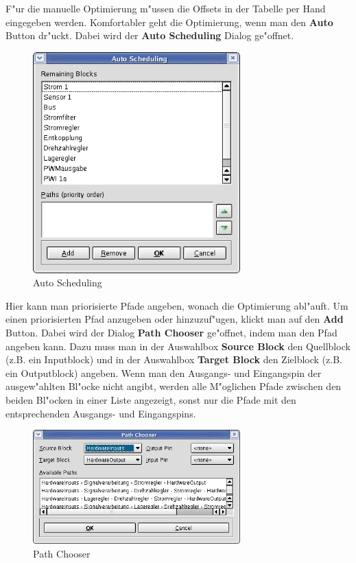 \documentclass[a4paper,titlepage,12pt,ngerman]{scrbook}
\begin{document}
F"ur die manuelle Optimierung m"ussen die Offsets in der Tabelle per Hand eingegeben werden. Komfortabler geht die Optimierung, wenn man den {\bf Auto} Button dr"uckt. Dabei wird der {\bf Auto Scheduling} Dialog ge"offnet.
\begin{figure}[htbp]

\begin{center}

\includegraphics[width=8cm]{AutoScheduling}

\caption{Auto Scheduling}\label{test}

\end{center}
\end{figure}
Hier kann man priorisierte Pfade angeben, wonach die Optimierung abl"auft. Um einen priorisierten Pfad anzugeben oder hinzuzuf"ugen, klickt man auf den {\bf Add} Button. Dabei wird der Dialog {\bf Path Chooser} ge"offnet, indem man den Pfad angeben kann. Dazu muss man in der Auswahlbox {\bf Source Block} den Quellblock (z.B. ein Inputblock) und in der Auswahlbox {\bf Target Block} den Zielblock (z.B. ein Outputblock) angeben. Wenn man den Ausgangs- und Eingangspin der ausgew"ahlten Bl"ocke nicht angibt, werden alle M"oglichen Pfade zwischen den beiden Bl"ocken in einer Liste angezeigt, sonst nur die Pfade mit den entsprechenden Ausgangs- und Eingangspins.
\begin{figure}[htbp]

\begin{center}

\includegraphics[width=8cm]{SchedulingPathChooser}

\caption{Path Chooser}\label{test}

\end{center}
\end{figure}
\end{document}

